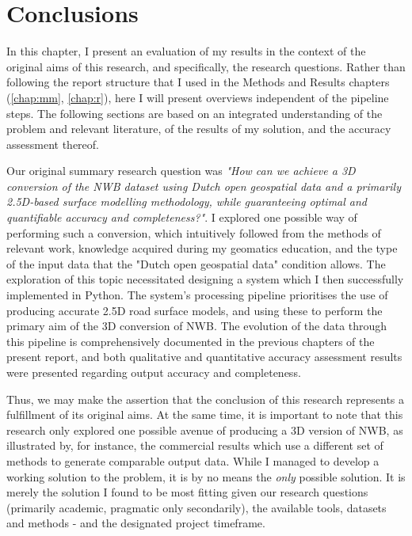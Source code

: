 
\chapter{Conclusions}
\label{chap:c}

In this chapter, I present an evaluation of my results in the context of the original aims of this research, and specifically, the research questions. Rather than following the report structure that I used in the Methods and Results chapters (\ref{chap:mm}, \ref{chap:r}), here I will present overviews independent of the pipeline steps. The following sections are based on an integrated understanding of the problem and relevant literature, of the results of my solution, and the accuracy assessment thereof.

Our original summary research question was \textit{"How can we achieve a 3D conversion of the NWB dataset using Dutch open geospatial data and a primarily 2.5D-based surface modelling methodology, while guaranteeing optimal and quantifiable accuracy and completeness?"}. I explored one possible way of performing such a conversion, which intuitively followed from the methods of relevant work, knowledge acquired during my geomatics education, and the type of the input data that the "Dutch open geospatial data" condition allows. The exploration of this topic necessitated designing a system which I then successfully implemented in Python. The system's processing pipeline prioritises the use of producing accurate 2.5D road surface models, and using these to perform the primary aim of the 3D conversion of NWB. The evolution of the data through this pipeline is comprehensively documented in the previous chapters of the present report, and both qualitative and quantitative accuracy assessment results were presented regarding output accuracy and completeness.

Thus, we may make the assertion that the conclusion of this research represents a fulfillment of its original aims. At the same time, it is important to note that this research only explored one possible avenue of producing a 3D version of NWB, as illustrated by, for instance, the commercial results which use a different set of methods to generate comparable output data. While I managed to develop a working solution to the problem, it is by no means the \textit{only} possible solution. It is merely the solution I found to be most fitting given our research questions (primarily academic, pragmatic only secondarily), the available tools, datasets and methods - and the designated project timeframe.

